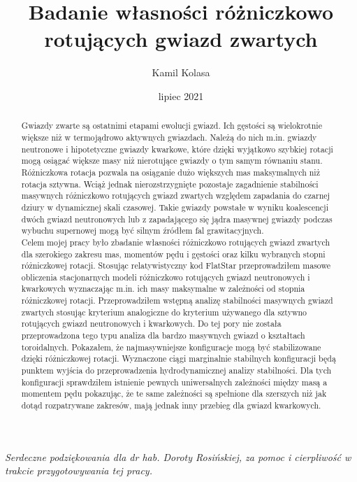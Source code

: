 \documentclass{bachelor_thesis}
\author{Kamil Kolasa}
\title{Badanie własności różniczkowo rotujących gwiazd zwartych}
\date{lipiec 2021}
\begin{document}
    \maketitle
    \let\cleardoublepage\clearpage
    
    \begin{abstract}
\hspace{.45cm} Gwiazdy zwarte są ostatnimi etapami ewolucji gwiazd. Ich gęstości są wielokrotnie większe niż w termojądrowo aktywnych gwiazdach. Należą do nich m.in. gwiazdy neutronowe i hipotetyczne gwiazdy kwarkowe, które dzięki wyjątkowo szybkiej rotacji mogą osiągać większe masy niż nierotujące gwiazdy o tym samym równaniu stanu. Różniczkowa rotacja pozwala na osiąganie dużo większych mas maksymalnych niż rotacja sztywna. Wciąż jednak nierozstrzygnięte pozostaje zagadnienie stabilności masywnych różniczkowo rotujących gwiazd zwartych względem zapadania do czarnej dziury w dynamicznej skali czasowej. Takie gwiazdy powstałe w wyniku koalescencji dwóch gwiazd neutronowych lub z zapadającego się jądra masywnej gwiazdy podczas wybuchu supernowej mogą być silnym źródłem fal grawitacyjnych.\\
\indent Celem mojej pracy było zbadanie własności różniczkowo rotujących gwiazd zwartych dla szerokiego zakresu mas, momentów pędu i gęstości oraz kilku wybranych stopni różniczkowej rotacji. Stosując relatywistyczny kod FlatStar przeprowadziłem masowe obliczenia stacjonarnych modeli różniczkowo rotujących gwiazd neutronowych i kwarkowych wyznaczając m.in. ich masy maksymalne w zależności od stopnia różniczkowej rotacji. Przeprowadziłem wstępną analizę stabilności masywnych gwiazd zwartych stosując kryterium analogiczne do kryterium używanego dla sztywno rotujących gwiazd neutronowych i kwarkowych. Do tej pory nie została przeprowadzona tego typu analiza dla bardzo masywnych gwiazd o kształtach toroidalnych. Pokazałem, że najmasywniejsze konfiguracje mogą być stabilizowane dzięki różniczkowej rotacji. Wyznaczone ciągi marginalnie stabilnych konfiguracji będą punktem wyjścia do przeprowadzenia hydrodynamicznej analizy stabilności. Dla tych konfiguracji sprawdziłem istnienie pewnych uniwersalnych zależności między masą a momentem pędu pokazując, że te same zależności są spełnione dla szerszych niż jak dotąd rozpatrywane zakresów, mają jednak inny przebieg dla gwiazd kwarkowych.

     \end{abstract}

\newpage
\thispagestyle{empty}
\newpage
 \thispagestyle{empty}
 \begin{minipage}{10cm} \hfill
 \end{minipage}%
 \begin{minipage}{5cm}
  \vspace{18.5cm}
  { \textit{Serdeczne podziękowania dla dr hab. Doroty Rosińskiej, za pomoc i cierpliwość w trakcie przygotowywania tej pracy.
}}
\end{minipage}
    
\end{document}
